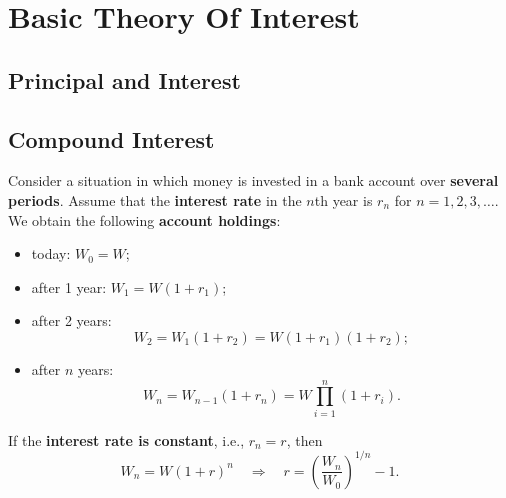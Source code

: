 \chapter{Basic Theory Of Interest}


\section{Principal and Interest}



\section{Compound Interest}
Consider a situation in which money is invested in a bank account over \textbf{several periods}. Assume that the \textbf{interest rate} in the \( n \)th year is \( r_n \) for \( n = 1, 2, 3, \ldots \). We obtain the following \textbf{account holdings}:
\begin{itemize}[label=\textbullet]
    \item today: \( W_0 = W \);
    \item after 1 year: \( W_1 = W(1 + r_1) \);
    \item after 2 years: 
    \[
    W_2 = W_1(1 + r_2) = W(1 + r_1)(1 + r_2);
    \]
    \item after \( n \) years: 
    \[
    W_n = W_{n-1}(1 + r_n) = W \prod_{i=1}^n (1 + r_i).
    \]
\end{itemize}

If the \textbf{interest rate is constant}, i.e., \( r_n = r \), then
\[
W_n = W(1 + r)^n \quad \Rightarrow \quad r = \left( \frac{W_n}{W_0} \right)^{1/n} - 1.
\]

